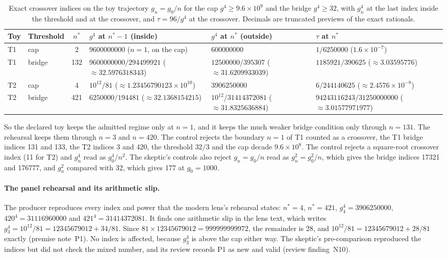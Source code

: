\begin{table}[htbp]
\centering\small
\caption{Exact crossover indices on the toy trajectory $g_n=g_0/n$ for the
cap $g^4\ge9.6\times10^9$ and the bridge $g^4\ge32$, with $g_n^4$ at the last
index inside the threshold and at the crossover, and $\tau=96/g^4$ at the
crossover. Decimals are truncated previews of the exact rationals.}
\label{tab:az1-toy}
\setlength{\tabcolsep}{4pt}
\begin{tabularx}{\linewidth}{@{}llc
 >{\raggedright\arraybackslash}X >{\raggedright\arraybackslash}X
 >{\raggedright\arraybackslash}X@{}}
\toprule
Toy & Threshold & $n^*$ & $g^4$ at $n^*-1$ (inside) & $g^4$ at $n^*$ (outside) & $\tau$ at $n^*$\\
\midrule
T1 & cap & 2 & $9600000000$ ($n=1$, on the cap) & $600000000$ &
$1/6250000$ ($1.6\times10^{-7}$)\\[3pt]
T1 & bridge & 132 & $9600000000/294499921$ ($\approx32.5976318343$) &
$12500000/395307$ ($\approx31.6209933039$) & $1185921/390625$
($\approx3.03595776$)\\[3pt]
T2 & cap & 4 & $10^{12}/81$ ($\approx1.23456790123\times10^{10}$) &
$3906250000$ & $6/244140625$ ($\approx2.4576\times10^{-8}$)\\[3pt]
T2 & bridge & 421 & $6250000/194481$ ($\approx32.1368154215$) &
$10^{12}/31414372081$ ($\approx31.8325636884$) &
$94243116243/31250000000$ ($\approx3.01577971977$)\\
\bottomrule
\end{tabularx}
\end{table}

So the declared toy keeps the admitted regime only at $n=1$, and it keeps the
much weaker bridge condition only through $n=131$. The rehearsal keeps them
through $n=3$ and $n=420$. The control 
rejects the boundary $n=1$ of T1 counted as a crossover, the T1 bridge
indices 131 and 133, the T2 indices 3 and 420, the threshold $32/3$ and the
cap decade $9.6\times10^8$. The control  rejects a
square-root crossover index (11 for T2) and $g_n^4$ read as $g_0^4/n^2$. The
skeptic's controls also reject $g_n=g_0/n$ read as $g_n^2=g_0^2/n$, which
gives the bridge indices 17321 and 176777, and $g_n^2$ compared with 32, which
gives 177 at $g_0=1000$.

\paragraph{The panel rehearsal and its arithmetic slip.}
The producer reproduces every index and power that the modern lens's
rehearsal states: $n^*=4$, $n^*=421$, $g_4^4=3906250000$,
$420^4=31116960000$ and $421^4=31414372081$. It finds one arithmetic slip in
the lens text, which writes $g_3^4=10^{12}/81=12345679012+34/81$. Since
$81\times12345679012=999999999972$, the remainder is 28, and
$10^{12}/81=12345679012+28/81$ exactly (premise note~P1). No index is
affected, because $g_3^4$ is above the cap either way. The skeptic's
pre-comparison reproduced the indices but did not check the mixed number, and
its review records P1 as new and valid (review finding~N10).

